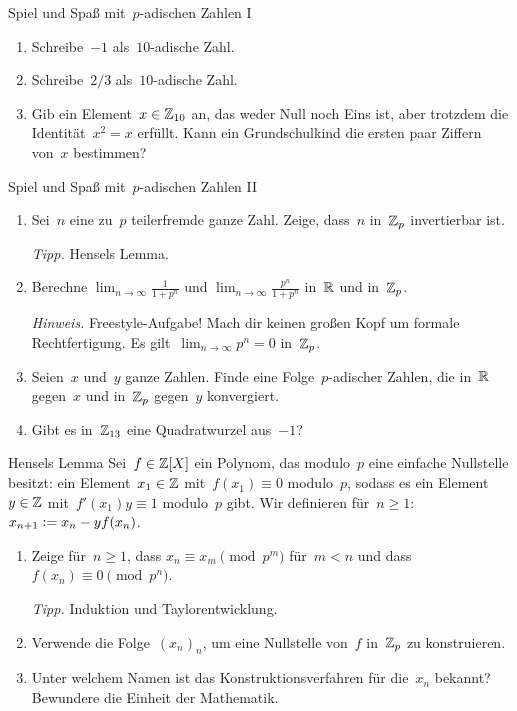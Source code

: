 \documentclass[entwurf]{uebblatt}
\begin{document}

\begin{aufgabe}{Spiel und Spaß mit~$p$-adischen Zahlen I}
\begin{enumerate}
\item Schreibe~$-1$ als~$10$-adische Zahl.
\item Schreibe~$2/3$ als~$10$-adische Zahl.
\item Gib ein Element~$x \in \mathbb{Z}_{10}$ an, das weder Null noch Eins ist, aber trotzdem
die Identität~$x^2 = x$ erfüllt. Kann ein Grundschulkind die ersten paar
Ziffern von~$x$ bestimmen?
\end{enumerate}
\end{aufgabe}

\begin{aufgabe}{Spiel und Spaß mit~$p$-adischen Zahlen II}
\begin{enumerate}
\item Sei~$n$ eine zu~$p$ teilerfremde ganze Zahl. Zeige, dass~$n$ in~$\mathbb{Z}_p$
invertierbar ist.

{\tiny\emph{Tipp.} Hensels Lemma.\par}
\item Berechne $\lim_{n \to \infty} \frac{1}{1 + p^n}$ und $\lim_{n \to \infty}
\frac{p^n}{1 + p^n}$ in~$\mathbb{R}$ und in~$\mathbb{Z}_p$.

{\tiny\emph{Hinweis.} Freestyle-Aufgabe! Mach dir keinen großen Kopf um formale
Rechtfertigung. Es gilt~$\lim_{n \to \infty} p^n = 0$ in~$\mathbb{Z}_p$.\par}
\item Seien~$x$ und~$y$ ganze Zahlen. Finde eine Folge~$p$-adischer Zahlen, die
in~$\mathbb{R}$ gegen~$x$ und in~$\mathbb{Z}_p$ gegen~$y$ konvergiert.
\item Gibt es in~$\mathbb{Z}_{13}$ eine Quadratwurzel aus~$-1$?
\end{enumerate}
\end{aufgabe}

\begin{aufgabe}{Hensels Lemma}
Sei~$f \in \mathbb{Z}[X]$ ein
Polynom, das modulo~$p$ eine einfache Nullstelle besitzt: ein Element~$x_1
\in \mathbb{Z}$ mit~$f(x_1) \equiv 0$ modulo~$p$, sodass es ein Element~$y \in \mathbb{Z}$
mit~$f'(x_1) y \equiv 1$ modulo~$p$ gibt.
Wir definieren für~$n \geq 1$: $x_{n+1} \vcentcolon= x_n - y f(x_n)$.
\begin{enumerate}
\item Zeige für~$n \geq 1$, dass $x_n \equiv x_m \pmod{p^m}$ für~$m < n$ und dass~$f(x_n) \equiv 0 \pmod{p^n}$.

{\tiny\emph{Tipp.} Induktion und Taylorentwicklung.\par}
\item Verwende die Folge~$(x_n)_n$, um eine Nullstelle von~$f$ in~$\mathbb{Z}_p$ zu
konstruieren.
\item Unter welchem Namen ist das Konstruktionsverfahren für die~$x_n$ bekannt?
Bewundere die Einheit der Mathematik.
\end{enumerate}
\end{aufgabe}
\end{document}
